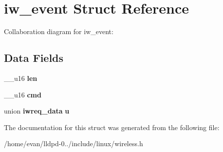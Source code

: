 \section{iw\-\_\-event \-Struct \-Reference}
\label{structiw__event}


\-Collaboration diagram for iw\-\_\-event\-:
\subsection*{\-Data \-Fields}
\begin{DoxyCompactItemize}
\item 
\-\_\-\-\_\-u16 {\bfseries len}\label{structiw__event_a4349a44061fbc14c453014c0d07881b1}

\item 
\-\_\-\-\_\-u16 {\bfseries cmd}\label{structiw__event_af70e433620500cd406e2207da6fdf275}

\item 
union {\bf iwreq\-\_\-data} {\bfseries u}\label{structiw__event_a102ade1cd28a774d4f80b0cf30b20b8a}

\end{DoxyCompactItemize}


\-The documentation for this struct was generated from the following file\-:\begin{DoxyCompactItemize}
\item 
/home/evan/lldpd-\/0../include/linux/wireless.\-h\end{DoxyCompactItemize}
